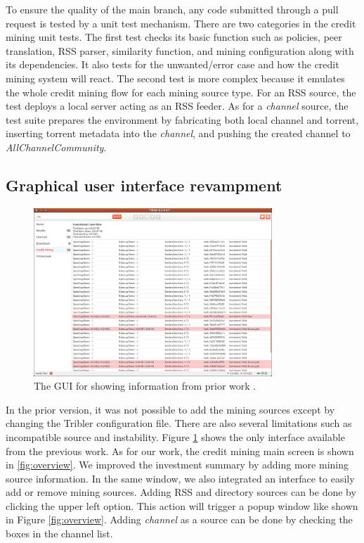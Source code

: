 To ensure the quality of the main branch, any code submitted through a pull request is tested by a unit test mechanism. There are two categories in the credit mining unit tests. The first test checks its basic function such as policies, peer translation, RSS parser, similarity function, and mining configuration along with its dependencies. It also tests for the unwanted/error case and how the credit mining system will react. The second test is more complex because it emulates the whole credit mining flow for each mining source type. For an RSS source, the test deploys a local server acting as an RSS feeder. As for a \textit{channel} source, the test suite prepares the environment by fabricating both local channel and torrent, inserting torrent metadata into the \textit{channel}, and pushing the created channel to \textit{AllChannelCommunity}. 

\subsection{Graphical user interface revampment}
\begin{figure}[h]
	\centering
	\includegraphics[width=0.8\textwidth]{pics/old_cm.png}
	\caption{The GUI for showing information from prior work \cite{2015:creditmining:capota}.}
	\label{fig:oldcm}
\end{figure}
In the prior version, it was not possible to add the mining sources except by changing the Tribler configuration file. There are also several limitations such as incompatible source and instability. Figure \ref{fig:oldcm} shows the only interface available from the previous work. As for our work, the credit mining main screen is shown in \ref{fig:overview}. We improved the investment summary by adding more mining source information. In the same window, we also integrated an interface to easily add or remove mining sources. Adding RSS and directory sources can be done by clicking the upper left option. This action will trigger a popup window like shown in Figure \ref{fig:overview}. Adding \textit{channel} as a source can be done by checking the boxes in the channel list.

